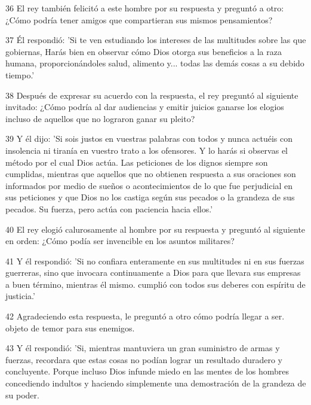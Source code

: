 \par 36 El rey también felicitó a este hombre por su respuesta y preguntó a otro: ¿Cómo podría tener amigos que compartieran sus mismos pensamientos?

\par 37 Él respondió: 'Si te ven estudiando los intereses de las multitudes sobre las que gobiernas, Harás bien en observar cómo Dios otorga sus beneficios a la raza humana, proporcionándoles salud, alimento y... todas las demás cosas a su debido tiempo.'

\par 38 Después de expresar su acuerdo con la respuesta, el rey preguntó al siguiente invitado: ¿Cómo podría al dar audiencias y emitir juicios ganarse los elogios incluso de aquellos que no lograron ganar su pleito?

\par 39 Y él dijo: 'Si sois justos en vuestras palabras con todos y nunca actuéis con insolencia ni tiranía en vuestro trato a los ofensores. Y lo harás si observas el método por el cual Dios actúa. Las peticiones de los dignos siempre son cumplidas, mientras que aquellos que no obtienen respuesta a sus oraciones son informados por medio de sueños o acontecimientos de lo que fue perjudicial en sus peticiones y que Dios no los castiga según sus pecados o la grandeza de sus pecados. Su fuerza, pero actúa con paciencia hacia ellos.'

\par 40 El rey elogió calurosamente al hombre por su respuesta y preguntó al siguiente en orden: ¿Cómo podía ser invencible en los asuntos militares?

\par 41 Y él respondió: 'Si no confiara enteramente en sus multitudes ni en sus fuerzas guerreras, sino que invocara continuamente a Dios para que llevara sus empresas a buen término, mientras él mismo. cumplió con todos sus deberes con espíritu de justicia.'

\par 42 Agradeciendo esta respuesta, le preguntó a otro cómo podría llegar a ser. objeto de temor para sus enemigos.

\par 43 Y él respondió: 'Si, mientras mantuviera un gran suministro de armas y fuerzas, recordara que estas cosas no podían lograr un resultado duradero y concluyente. Porque incluso Dios infunde miedo en las mentes de los hombres concediendo indultos y haciendo simplemente una demostración de la grandeza de su poder.

